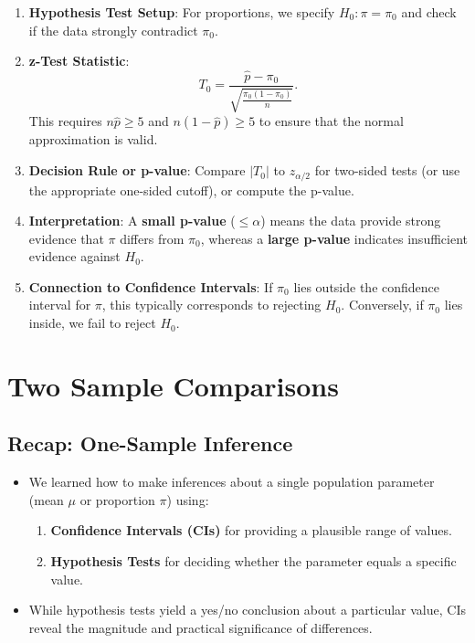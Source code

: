 \documentclass[10pt]{extarticle}
\begin{document}
\begin{takeaway-box}{}{}    
    \begin{enumerate}
        \item \textbf{Hypothesis Test Setup}: For proportions, we specify $H_0: \pi=\pi_0$ and check if the data strongly contradict $\pi_0$.
        \item \textbf{z-Test Statistic}:
        \[
        T_0 = \frac{\hat{p}-\pi_0}{\sqrt{\frac{\pi_0(1-\pi_0)}{n}}}.
        \]
        This requires $n\hat{p}\ge5$ and $n(1-\hat{p})\ge5$ to ensure that the normal approximation is valid.
        \item \textbf{Decision Rule or p-value}: Compare $\lvert T_0\rvert$ to $z_{\alpha/2}$ for two-sided tests (or use the appropriate one-sided cutoff), or compute the p-value.
        \item \textbf{Interpretation}: A \textbf{small p-value} ($\le \alpha$) means the data provide strong evidence that $\pi$ differs from $\pi_0$, whereas a \textbf{large p-value} indicates insufficient evidence against $H_0$.
        \item \textbf{Connection to Confidence Intervals}: If $\pi_0$ lies outside the confidence interval for $\pi$, this typically corresponds to rejecting $H_0$. Conversely, if $\pi_0$ lies inside, we fail to reject $H_0$.
    \end{enumerate}
\end{takeaway-box}
\section{Two Sample Comparisons}

\subsection{Recap: One-Sample Inference}
\begin{itemize}
    \item We learned how to make inferences about a single population parameter (mean $\mu$ or proportion $\pi$) using:
    \begin{enumerate}
        \item \textbf{Confidence Intervals (CIs)} for providing a plausible range of values.
        \item \textbf{Hypothesis Tests} for deciding whether the parameter equals a specific value.
    \end{enumerate}
    \item While hypothesis tests yield a yes/no conclusion about a particular value, CIs reveal the magnitude and practical significance of differences.
\end{itemize}
\pagebreak
\end{document}
